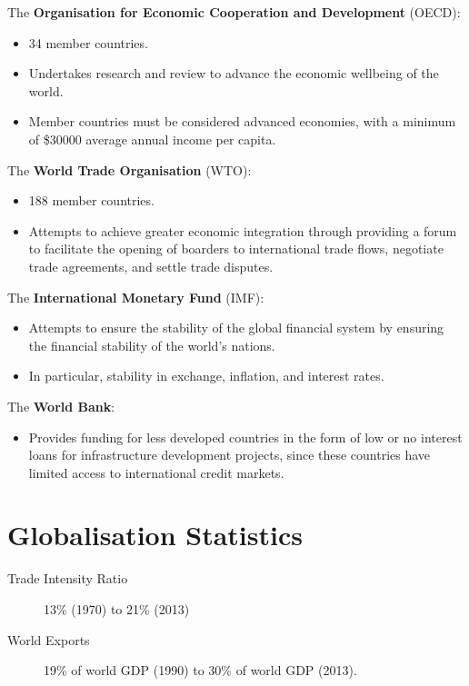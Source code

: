 \documentclass[a4paper,11pt]{report}
\begin{document}
The \textbf{Organisation for Economic Cooperation and Development} (OECD):

\begin{itemize}
\item 34 member countries.
\item Undertakes research and review to advance the economic wellbeing of the
	world.
\item Member countries must be considered advanced economies, with a minimum of
	\$30000 average annual income per capita.
\end{itemize}

The \textbf{World Trade Organisation} (WTO):

\begin{itemize}
\item 188 member countries.
\item Attempts to achieve greater economic integration through providing a
	forum to facilitate the opening of boarders to international trade flows,
	negotiate trade agreements, and settle trade disputes.
\end{itemize}

The \textbf{International Monetary Fund} (IMF):

\begin{itemize}
\item Attempts to ensure the stability of the global financial system by
	ensuring the financial stability of the world's nations.
\item In particular, stability in exchange, inflation, and interest rates.
\end{itemize}

The \textbf{World Bank}:

\begin{itemize}
\item Provides funding for less developed countries in the form of low or no
	interest loans for infrastructure development projects, since these
	countries have limited access to international credit markets.
\end{itemize}


\section{Globalisation Statistics}

\begin{description}
\item [Trade Intensity Ratio] 13\% (1970) to 21\% (2013)
\item [World Exports] 19\% of world GDP (1990) to 30\% of world GDP (2013).
\end{description}
\end{document}
